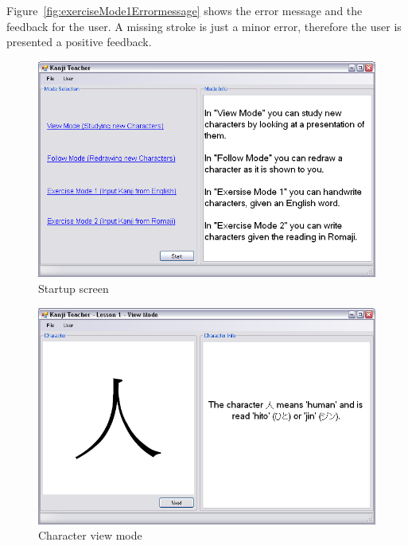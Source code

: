 Figure~\ref{fig:exerciseMode1Errormessage} shows the error message and
the feedback for the user. A missing stroke is just a minor error,
therefore the user is presented a positive feedback.

\begin{figure}[htbp]
\begin{center}
\includegraphics[scale=0.6]{images/ConceptualDesign/startupScreen.png}
\caption{Startup screen}
\label{fig:startupScreen}
\end{center}
\end{figure}

\begin{figure}[htbp]
\begin{center}
\includegraphics[scale=0.6]{images/ConceptualDesign/viewMode.png}
\caption{Character view mode}
\label{fig:viewMode}
\end{center}
\end{figure}

